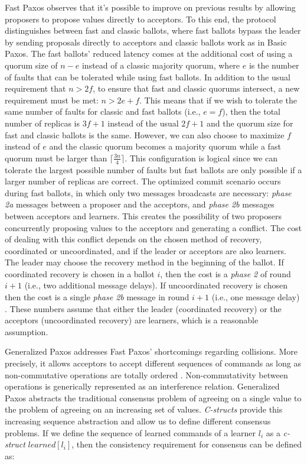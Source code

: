 Fast Paxos observes that it's possible to improve on previous results by allowing proposers to propose values directly to acceptors. To this end, the protocol distinguishes between fast and classic ballots, where fast ballots bypass the leader by sending proposals directly to acceptors and classic ballots work as in Basic Paxos. The fast ballots' reduced latency comes at the additional cost of using a quorum size of $n-e$ instead of a classic majority quorum, where $e$ is the number of faults that can be tolerated while using fast ballots. In addition to the usual requirement that $n> 2f$, to ensure that fast and classic quorums intersect, a new requirement must be met: $n > 2e+f$. This means that if we wish to tolerate the same number of faults for classic and fast ballots (i.e., $e=f$), then the total number of replicas is $3f+1$ instead of the usual $2f+1$ and the quorum size for fast and classic ballots is the same. However, we can also choose to maximize $f$ instead of $e$ and the classic quorum becomes a majority quorum while a fast quorum must be larger than $\lceil \frac{3n}{4} \rceil$. This configuration is logical since we can tolerate the largest possible number of faults but fast ballots are only possible if a larger number of replicas are correct. The optimized commit scenario occurs during fast ballots, in which only two messages broadcasts are necessary: \textit{phase 2a} messages between a proposer and the acceptors, and \textit{phase 2b} messages between acceptors and learners. This creates the possibility of two proposers concurrently proposing values to the acceptors and generating a conflict. The cost of dealing with this conflict depends on the chosen method of recovery, coordinated or uncoordinated, and if the leader or acceptors are also learners. The leader may choose  the recovery method in the beginning of the ballot. If coordinated recovery is chosen in a ballot $i$, then the cost is a \textit{phase 2} of round $i+1$ (i.e., two additional message delays). If uncoordinated recovery is chosen then the cost is a single \textit{phase 2b} message in round $i+1$ (i.e., one message delay) \cite{Lamport2006}. These numbers assume that either the leader (coordinated recovery) or the acceptors (uncoordinated recovery) are learners, which is a reasonable assumption. \par
Generalized Paxos addresses Fast Paxos' shortcomings regarding collisions. More precisely, it allows acceptors to accept different sequences of commands as long as non-commutative operations are totally ordered \cite{Lamport2005}.  Non-commutativity between operations is generically represented as an interference relation. Generalized Paxos abstracts the traditional consensus problem of agreeing on a single value to the problem of agreeing on an increasing set of values. \textit{C-structs} provide this increasing sequence abstraction and allow us to define different consensus problems. If we define the sequence of learned commands of a learner $l_i$ as a \textit{c-struct} $learned[l_i]$, then the consistency requirement for consensus can be defined as:\par
